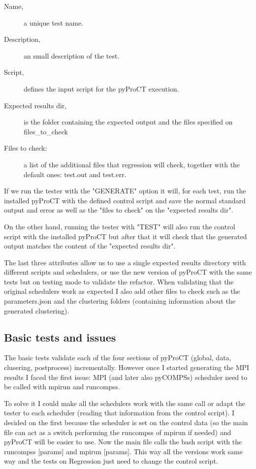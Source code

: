 \begin{description}
\item [Name,] a unique test name.
\item [Description,] an small description of the test.
\item [Script,] defines the input script for the pyProCT execution. 
\item [Expected results dir,] is the folder containing the expected output and the files specified on files\_to\_check
\item [Files to check:] a list of the additional files that regression will check, together with the default ones: test.out and test.err.
\end{description}

If we run the tester with the "GENERATE" option it will, for each test, run the installed pyProCT with the defined control script and save the normal standard output and error as well as the "files to check" on the "expected results dir".

On the other hand, running the tester with "TEST" will also run the control script with the installed pyProCT but after that it will check that the generated output matches the content of the "expected results dir".

The last three attributes allow us to use a single expected results directory with different scripts and schedulers, or use the new version of pyProCT with the same tests but on testing mode to validate the refactor. When validating that the original schedulers work as expected I also add other files to check such as the parameters.json and the clustering folders (containing information about the generated clustering).

\subsection{Basic tests and issues}

The basic tests validate each of the four sections of pyProCT (global, data, clusering, postprocess) incrementally. However once I started generating the MPI results I faced the first issue: MPI (and later also pyCOMPSs) scheduler need to be called with mpirun and runcompss. 

To solve it I could make all the schedulers work with the same call or adapt the tester to each scheduler (reading that information from the control script). I decided on the first because the scheduler is set on the control data (so the main file can act as a switch performing the runcompss of mpirun if needed) and pyProCT will be easier to use. Now the main file calls the bash script with the runcompss [params] and mpirun [params]. This way all the versions work same way and the tests on Regression just need to change the control script.

